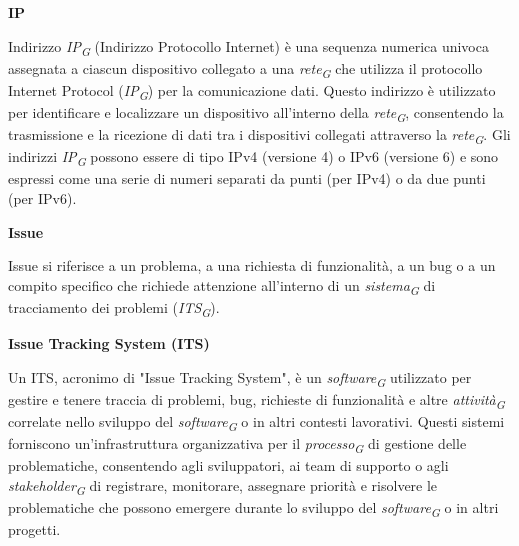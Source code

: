 \documentclass{article}
\begin{document}
\vspace{0.4cm}

\textbf{IP}

\vspace{0.1cm}

Indirizzo \textit{IP}\textsubscript{\textit{G}} (Indirizzo Protocollo Internet) è una sequenza numerica univoca assegnata a ciascun dispositivo collegato a una \textit{rete}\textsubscript{\textit{G}} che utilizza il protocollo Internet Protocol (\textit{IP}\textsubscript{\textit{G}}) per la comunicazione dati. Questo indirizzo è utilizzato per identificare e localizzare un dispositivo all'interno della \textit{rete}\textsubscript{\textit{G}}, consentendo la trasmissione e la ricezione di dati tra i dispositivi collegati attraverso la \textit{rete}\textsubscript{\textit{G}}. Gli indirizzi \textit{IP}\textsubscript{\textit{G}} possono essere di tipo IPv4 (versione 4) o IPv6 (versione 6) e sono espressi come una serie di numeri separati da punti (per IPv4) o da due punti (per IPv6).

\vspace{0.4cm}

\textbf{Issue}

\vspace{0.1cm}

Issue si riferisce a un problema, a una richiesta di funzionalità, a un bug o a un compito specifico che richiede attenzione all'interno di un \textit{sistema}\textsubscript{\textit{G}} di tracciamento dei problemi (\textit{ITS}\textsubscript{\textit{G}}).

\vspace{0.4cm}

\textbf{Issue Tracking System (ITS)}

\vspace{0.1cm}

Un ITS, acronimo di "Issue Tracking System", è un \textit{software}\textsubscript{\textit{G}} utilizzato per gestire e tenere traccia di problemi, bug, richieste di funzionalità e altre \textit{attività}\textsubscript{\textit{G}} correlate nello sviluppo del \textit{software}\textsubscript{\textit{G}} o in altri contesti lavorativi. Questi sistemi forniscono un'infrastruttura organizzativa per il \textit{processo}\textsubscript{\textit{G}} di gestione delle problematiche, consentendo agli sviluppatori, ai team di supporto o agli \textit{stakeholder}\textsubscript{\textit{G}} di registrare, monitorare, assegnare priorità e risolvere le problematiche che possono emergere durante lo sviluppo del \textit{software}\textsubscript{\textit{G}} o in altri progetti.
\end{document}
